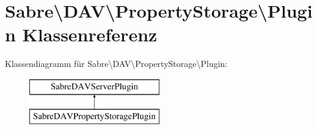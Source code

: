 \hypertarget{class_sabre_1_1_d_a_v_1_1_property_storage_1_1_plugin}{}\section{Sabre\textbackslash{}D\+AV\textbackslash{}Property\+Storage\textbackslash{}Plugin Klassenreferenz}
\label{class_sabre_1_1_d_a_v_1_1_property_storage_1_1_plugin}
Klassendiagramm für Sabre\textbackslash{}D\+AV\textbackslash{}Property\+Storage\textbackslash{}Plugin\+:\begin{figure}[H]
\begin{center}
\leavevmode
\includegraphics[height=2.000000cm]{class_sabre_1_1_d_a_v_1_1_property_storage_1_1_plugin}
\end{center}
\end{figure}
